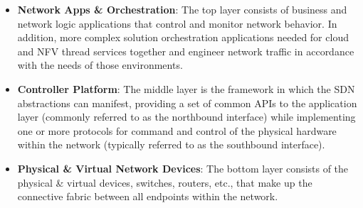 \documentclass[a4paper, 12pt]{book}
\begin{document}
\begin{itemize}\itemsep0pt
\item{\textbf{Network Apps \& Orchestration}}: The top layer consists of business and network logic applications that control and monitor network behavior. In addition, more complex solution orchestration applications needed for cloud and NFV thread services together and engineer network traffic in accordance with the needs of those environments.
\item{\textbf{Controller Platform}}: The middle layer is the framework in which the SDN abstractions can manifest, providing a set of common APIs to the application layer (commonly referred to as the northbound interface) while implementing one or more protocols for command and control of the physical hardware within the network (typically referred to as the southbound interface).
\item{\textbf{Physical \& Virtual Network Devices}}: The bottom layer consists of the physical \& virtual devices, switches, routers, etc., that make up the connective fabric between all endpoints within the network.
\end{itemize}
\end{document}
